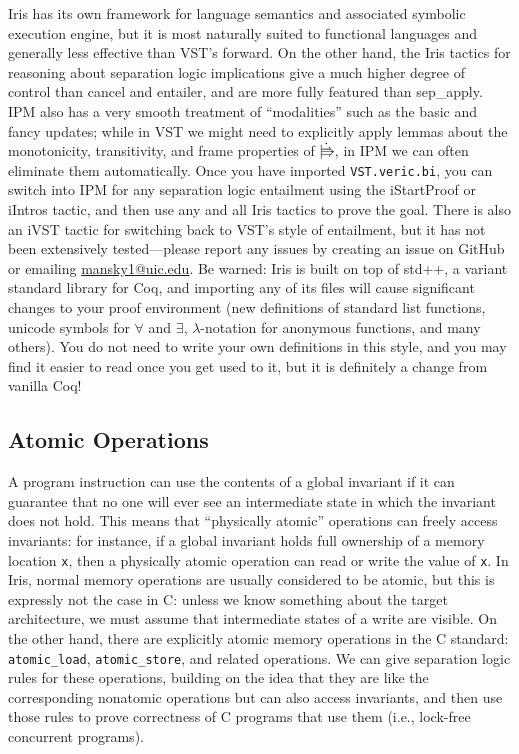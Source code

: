 \documentclass[11pt]{article} %
\begin{document}
Iris has its own framework for language semantics and associated symbolic execution engine, but it is most naturally suited to functional languages and generally less effective than VST's \textsf{forward}. On the other hand, the Iris tactics for reasoning about separation logic implications give a much higher degree of control than \textsf{cancel} and \textsf{entailer}, and are more fully featured than \textsf{sep\_apply}. IPM also has a very smooth treatment of ``modalities'' such as the basic and fancy updates; while in VST we might need to explicitly apply lemmas about the monotonicity, transitivity, and frame properties of $\upd$, in IPM we can often eliminate them automatically. Once you have imported \texttt{VST.veric.bi}, you can switch into IPM for any separation logic entailment using the \textsf{iStartProof} or \textsf{iIntros} tactic, and then use any and all Iris tactics to prove the goal. There is also an \textsf{iVST} tactic for switching back to VST's style of entailment, but it has not been extensively tested---please report any issues by creating an issue on GitHub or emailing \url{mansky1@uic.edu}. Be warned: Iris is built on top of std++, a variant standard library for Coq, and importing any of its files will cause significant changes to your proof environment (new definitions of standard list functions, unicode symbols for $\forall$ and $\exists$, $\lambda$-notation for anonymous functions, and many others). You do not need to write your own definitions in this style, and you may find it easier to read once you get used to it, but it is definitely a change from vanilla Coq!

\subsection{Atomic Operations}
A program instruction can use the contents of a global invariant if it can guarantee that no one will ever see an intermediate state in which the invariant does not hold. This means that ``physically atomic'' operations can freely access invariants: for instance, if a global invariant holds full ownership of a memory location \texttt{x}, then a physically atomic operation can read or write the value of \texttt{x}. In Iris, normal memory operations are usually considered to be atomic, but this is expressly not the case in C: unless we know something about the target architecture, we must assume that intermediate states of a write are visible. On the other hand, there are explicitly atomic memory operations in the C standard: \texttt{atomic\_load}, \texttt{atomic\_store}, and related operations. We can give separation logic rules for these operations, building on the idea that they are like the corresponding nonatomic operations but can also access invariants, and then use those rules to prove correctness of C programs that use them (i.e., lock-free concurrent programs).
\end{document}

